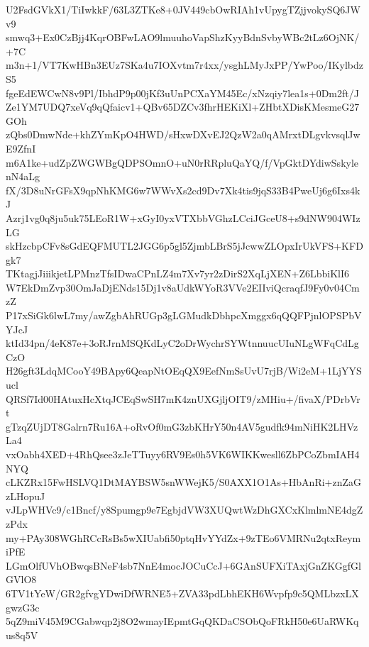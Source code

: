 U2FsdGVkX1/TiIwkkF/63L3ZTKe8+0JV449cbOwRIAh1vUpygTZjjvokySQ6JWv9
smwq3+Ex0CzBjj4KqrOBFwLAO9lmuuhoVapShzKyyBdnSvbyWBc2tLz6OjNK/+7C
m3n+1/VT7KwHBn3EUz7SKa4u7IOXvtm7r4xx/ysghLMyJxPP/YwPoo/IKylbdzS5
fgeEdEWCwN8v9Pl/IbhdP9p00jKf3uUnPCXaYM45Ec/xNzqiy7lea1s+0Dm2ft/J
Ze1YM7UDQ7xeVq9qQfaicv1+QBv65DZCv3fhrHEKiXl+ZHbtXDisKMesmeG27GOh
zQbs0DmwNde+khZYmKpO4HWD/sHxwDXvEJ2QzW2a0qAMrxtDLgvkvsqlJwE9ZfnI
m6A1ke+udZpZWGWBgQDPSOmnO+uN0rRRpluQaYQ/f/VpGktDYdiwSskylenN4aLg
fX/3D8uNrGFsX9qpNhKMG6w7WWvXs2cd9Dv7Xk4tis9jqS33B4PweUj6g6Ixs4kJ
Azrj1vg0q8ju5uk75LEoR1W+xGyI0yxVTXbbVGhzLCciJGceU8+s9dNW904WIzLG
skHzcbpCFv8sGdEQFMUTL2JGG6p5gl5ZjmbLBrS5jJcwwZLOpxIrUkVFS+KFDgk7
TKtagjJiiikjetLPMnzTfsIDwaCPnLZ4m7Xv7yr2zDirS2XqLjXEN+Z6LbbiKlI6
W7EkDmZvp30OmJaDjENds15Dj1v8aUdkWYoR3VVe2EIIviQcraqfJ9Fy0v04CmzZ
P17xSiGk6lwL7my/awZgbAhRUGp3gLGMudkDbhpcXmggx6qQQFPjnlOPSPbVYJcJ
ktId34pn/4eK87e+3oRJrnMSQKdLyC2oDrWychrSYWtnnuucUIuNLgWFqCdLgCzO
H26gft3LdqMCooY49BApy6QeapNtOEqQX9EefNmSsUvU7rjB/Wi2eM+1LjYYSucl
QRSf7Id00HAtuxHcXtqJCEqSwSH7mK4znUXGjljOIT9/zMHiu+/fivaX/PDrbVrt
gTzqZUjDT8Galrn7Ru16A+oRvOf0mG3zbKHrY50n4AV5gudfk94mNiHK2LHVzLa4
vxOabh4XED+4RhQsee3zJeTTuyy6RV9Es0h5VK6WIKKwesll6ZbPCoZbmIAH4NYQ
cLKZRx15FwHSLVQ1DtMAYBSW5snWWejK5/S0AXX1O1As+HbAnRi+znZaGzLHopuJ
vJLpWHVc9/c1Bncf/y8Spumgp9e7EgbjdVW3XUQwtWzDhGXCxKlmlmNE4dgZzPdx
my+PAy308WGhRCcRsBs5wXIUabfi50ptqHvYYdZx+9zTEo6VMRNu2qtxReymiPfE
LGmOlfUVhOBwqsBNeF4sb7NnE4mocJOCuCcJ+6GAnSUFXiTAxjGnZKGgfGlGVlO8
6TV1tYeW/GR2gfvgYDwiDfWRNE5+ZVA33pdLbhEKH6Wvpfp9c5QMLbzxLXgwzG3c
5qZ9miV45M9CGabwqp2j8O2wmayIEpmtGqQKDaCSObQoFRkH50e6UaRWKqus8q5V
